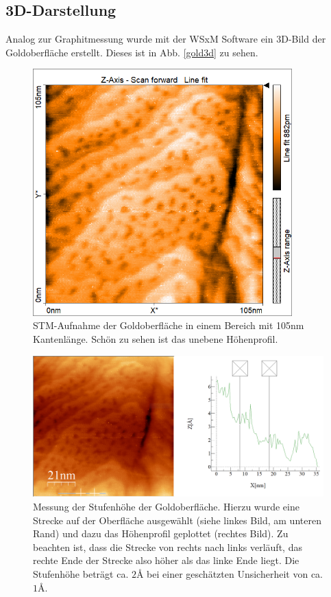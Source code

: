 \subsection{3D-Darstellung}
Analog zur Graphitmessung wurde mit der WSxM Software ein 3D-Bild der Goldoberfläche erstellt. Dieses ist in Abb. \ref{gold3d} zu sehen.

\begin{figure}[H]
	\begin{center}
	\includegraphics[width=10cm]{Mess/gold_oberfl.png}
	\caption{STM-Aufnahme der Goldoberfläche in einem Bereich mit 105nm Kantenlänge. Schön zu sehen ist das unebene Höhenprofil.}
	\label{gold_oberfl}
\end{center}
\end{figure}

\begin{figure}[H]
	\begin{center}
		\includegraphics[width=\linewidth]{Mess/gold_profil.png}
		\caption{Messung der Stufenhöhe der Goldoberfläche. Hierzu wurde eine Strecke auf der Oberfläche ausgewählt (siehe linkes Bild, am unteren Rand) und dazu das Höhenprofil geplottet (rechtes Bild). Zu beachten ist, dass die Strecke von rechts nach links verläuft, das rechte Ende der Strecke also höher als das linke Ende liegt. Die Stufenhöhe beträgt ca. $2\si{\angstrom}$ bei einer geschätzten Unsicherheit von ca. $1\si{\angstrom}$.}
		\label{gold_profil}
	\end{center}
\end{figure}
	



